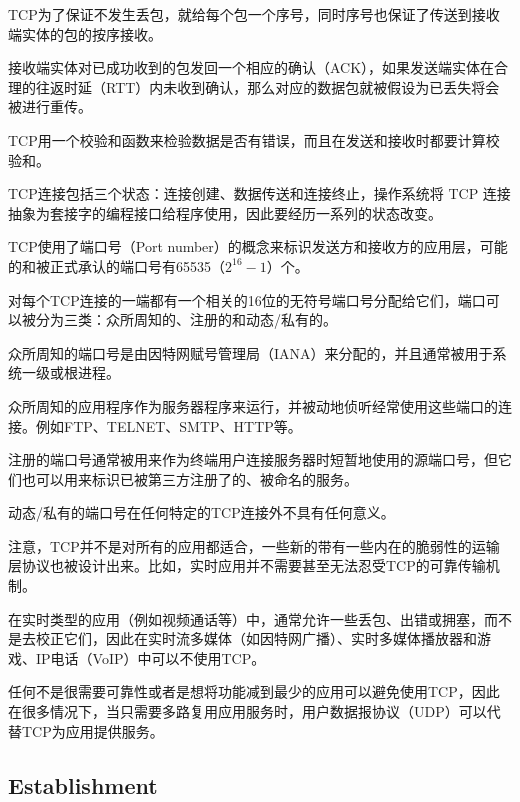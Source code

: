 TCP为了保证不发生丢包，就给每个包一个序号，同时序号也保证了传送到接收端实体的包的按序接收。

接收端实体对已成功收到的包发回一个相应的确认（ACK），如果发送端实体在合理的往返时延（RTT）内未收到确认，那么对应的数据包就被假设为已丢失将会被进行重传。

TCP用一个校验和函数来检验数据是否有错误，而且在发送和接收时都要计算校验和。

TCP连接包括三个状态：连接创建、数据传送和连接终止，操作系统将 TCP 连接抽象为套接字的编程接口给程序使用，因此要经历一系列的状态改变。

TCP使用了端口号（Port number）的概念来标识发送方和接收方的应用层，可能的和被正式承认的端口号有65535（$2^{16}-1$）个。


对每个TCP连接的一端都有一个相关的16位的无符号端口号分配给它们，端口可以被分为三类：众所周知的、注册的和动态/私有的。

\begin{compactitem}
\item 众所周知的端口号是由因特网赋号管理局（IANA）来分配的，并且通常被用于系统一级或根进程。

众所周知的应用程序作为服务器程序来运行，并被动地侦听经常使用这些端口的连接。例如FTP、TELNET、SMTP、HTTP等。

\item 注册的端口号通常被用来作为终端用户连接服务器时短暂地使用的源端口号，但它们也可以用来标识已被第三方注册了的、被命名的服务。

\item 动态/私有的端口号在任何特定的TCP连接外不具有任何意义。

\end{compactitem}


注意，TCP并不是对所有的应用都适合，一些新的带有一些内在的脆弱性的运输层协议也被设计出来。比如，实时应用并不需要甚至无法忍受TCP的可靠传输机制。

在实时类型的应用（例如视频通话等）中，通常允许一些丢包、出错或拥塞，而不是去校正它们，因此在实时流多媒体（如因特网广播）、实时多媒体播放器和游戏、IP电话（VoIP）中可以不使用TCP。

任何不是很需要可靠性或者是想将功能减到最少的应用可以避免使用TCP，因此在很多情况下，当只需要多路复用应用服务时，用户数据报协议（UDP）可以代替TCP为应用提供服务。


\subsection{Establishment}



